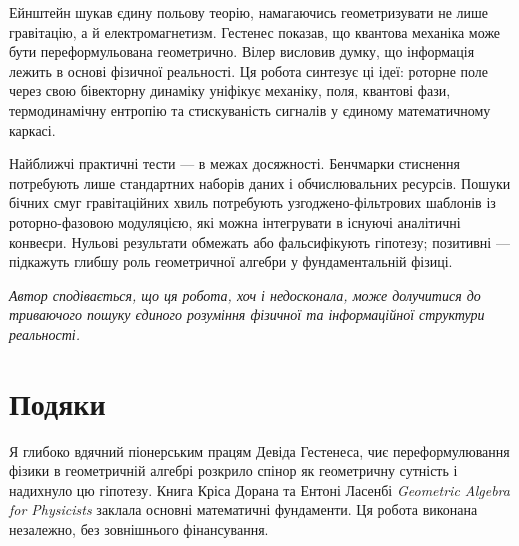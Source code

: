 \documentclass[11pt,a4paper]{article}
\theoremstyle{definition}
\theoremstyle{plain}
\theoremstyle{remark}
\begin{document}
Ейнштейн шукав єдину польову теорію, намагаючись геометризувати не лише гравітацію, а й електромагнетизм. Гестенес показав, що квантова механіка може бути переформульована геометрично. Вілер висловив думку, що інформація лежить в основі фізичної реальності. Ця робота синтезує ці ідеї: роторне поле через свою бівекторну динаміку уніфікує механіку, поля, квантові фази, термодинамічну ентропію та стискуваність сигналів у єдиному математичному каркасі.

Найближчі практичні тести — в межах досяжності. Бенчмарки стиснення потребують лише стандартних наборів даних і обчислювальних ресурсів. Пошуки бічних смуг гравітаційних хвиль потребують узгоджено-фільтрових шаблонів із роторно-фазовою модуляцією, які можна інтегрувати в існуючі аналітичні конвеєри. Нульові результати обмежать або фальсифікують гіпотезу; позитивні — підкажуть глибшу роль геометричної алгебри у фундаментальній фізиці.

\medskip
\noindent\textit{Автор сподівається, що ця робота, хоч і недосконала, може долучитися до триваючого пошуку єдиного розуміння фізичної та інформаційної структури реальності.}

\vspace{1em}

\section*{Подяки}

Я глибоко вдячний піонерським працям Девіда Гестенеса, чиє переформулювання фізики в геометричній алгебрі розкрило спінор як геометричну сутність і надихнуло цю гіпотезу. Книга Кріса Дорана та Ентоні Ласенбі \textit{Geometric Algebra for Physicists} заклала основні математичні фундаменти. Ця робота виконана незалежно, без зовнішнього фінансування.

\vspace{1em}
\end{document}

